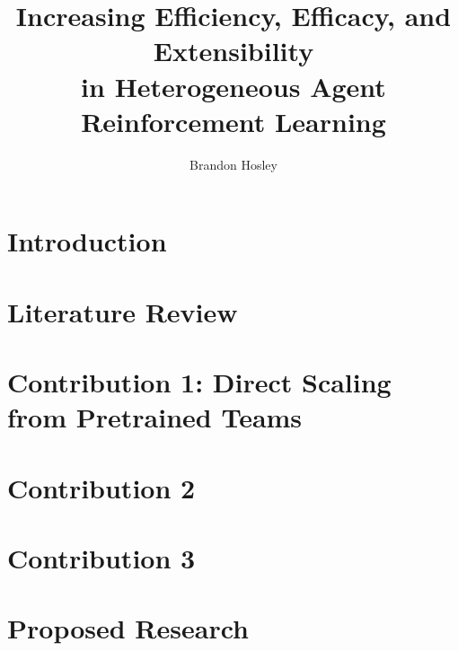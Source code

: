 \documentclass{afitthesis}
\title{%
    Increasing Efficiency, Efficacy, and Extensibility\\
    in Heterogeneous Agent Reinforcement Learning }
\author{Brandon Hosley}
\begin{document}
\maketitle %

\chapter{Introduction}%

\glsresetall

\chapter{Literature Review}%
\label{ch:literature_review}

\glsresetall

\chapter{Contribution 1: Direct Scaling from Pretrained Teams}
\label{ch:contribution_1}

\glsresetall

\chapter{Contribution 2}
\label{ch:contribution_2}

\glsresetall

\chapter{Contribution 3}%
\label{ch:contribution_3}

\glsresetall

\chapter{Proposed Research}%
\label{ch:methodology}

\glsresetall

%

%
\end{document}
